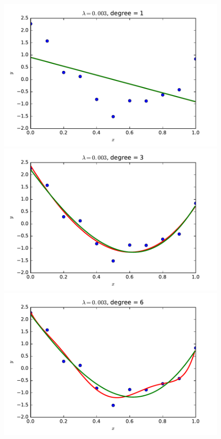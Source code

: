 \documentclass{article}
\begin{document}
\begin{multicols}{2}
\begin{figure}
   \centering
   \newlength{\picwidth}
   \setlength{\picwidth}{2in}
   \includegraphics[width=\picwidth]{img/3-1_ridge_lambd3_degree1.pdf}
   \includegraphics[width=\picwidth]{img/3-1_ridge_lambd3_degree3.pdf}
   \includegraphics[width=\picwidth]{img/3-1_ridge_lambd3_degree6.pdf}

\end{figure}
\end{multicols}
\end{document}
